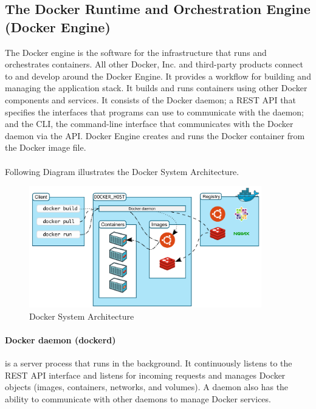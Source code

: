 		\subsection{The Docker Runtime and Orchestration Engine (Docker Engine)} 
		\label{Grundlagen:Docker:Docker Engine}
		The Docker engine is the software for the infrastructure that runs and orchestrates containers. All other Docker, Inc. and third-party products connect to and develop around the Docker Engine. It provides a workflow for building and managing the application stack. It builds and runs containers using other Docker components and services. It consists of the Docker daemon; a REST API that specifies the interfaces that programs can use to communicate with the daemon; and the CLI, the command-line interface that communicates with the Docker daemon via the API. Docker Engine creates and runs the Docker container from the Docker image file.\\
		\\
		Following Diagram illustrates the Docker System Architecture.
		\begin{figure}[H]
			\centering
			\includegraphics[width=0.9\textwidth]{"Bilder/DockerArchitecture.png"}
			\caption{Docker System Architecture \cite{dockerOverwiew}}
			\label{fig:Background:DockerEngine:Architecture}					
		\end{figure}

		\paragraph{Docker daemon (dockerd)}  is a server process that runs
		in the background. It continuously listens to the REST API interface
		and listens for incoming requests and manages Docker objects (images, containers, networks, and volumes).  A daemon also has the ability to communicate with other daemons to manage Docker services.\cite{dockerOverwiew}

